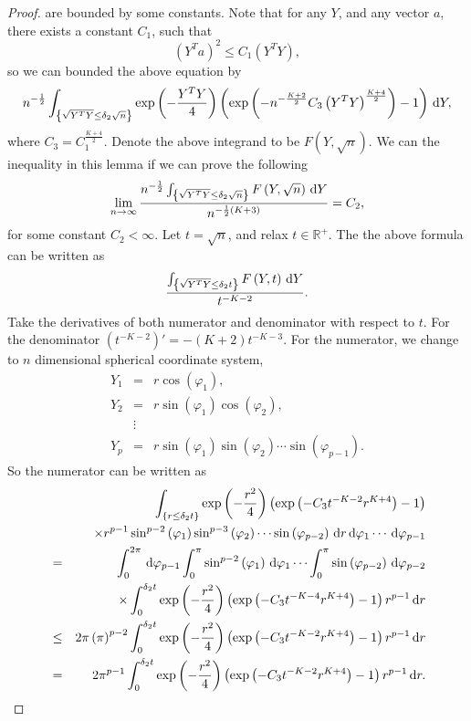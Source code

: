 \begin{proof}
are bounded by some constants. Note that for any $Y$, and any vector
$a$, there exists a constant $C_{1}$, such that 
\begin{equation}
\left(Y^{T}a\right)^{2}\le C_{1}\left(Y^{T}Y\right),\label{eq:average-inequality}
\end{equation}
so we can bounded the above equation by 
\[
n^{-\frac{1}{2}}\int_{\left\{ \sqrt{Y^{T}Y}\le\delta_{2}\sqrt{n}\right\} }\exp\left(-\frac{Y^{T}Y}{4}\right)\left(\exp\left(-n^{-\frac{K+2}{2}}C_{3}\left(Y^{T}Y\right)^{\frac{K+4}{2}}\right)-1\right)\,\mathrm{d} Y,
\]
where $C_{3}=C_{1}^{\frac{K+4}{2}}$. Denote the above integrand to
be $F\left(Y,\sqrt{n}\right)$. We can the inequality in this lemma
if we can prove the following 
\begin{equation}
\lim_{n\rightarrow\infty}\frac{n^{-\frac{1}{2}}\int_{\left\{ \sqrt{Y^{T}Y}\le\delta_{2}\sqrt{n}\right\} }F\left(Y,\sqrt{n}\right)\,\mathrm{d} Y}{n^{-\frac{1}{2}\left(K+3\right)}}=C_{2},\label{eq:lim-rhs-vs-lfs-inequality}
\end{equation}
for some constant $C_{2}<\infty$. Let $t=\sqrt{n}$, and relax $t\in\mathbb{R}^{+}$.
The the above formula can be written as 
\[
\frac{\int_{\left\{ \sqrt{Y^{T}Y}\le\delta_{2}t\right\} }F\left(Y,t\right)\,\mathrm{d} Y}{t^{-K-2}}.
\]
Take the derivatives of both numerator and denominator with respect
to $t$. For the denominator $\left(t^{-K-2}\right)'=-\left(K+2\right)t^{-K-3}.$
For the numerator, we change to $n$ dimensional spherical coordinate
system, 
\begin{eqnarray*}
Y_{1} & = & r\cos\left(\varphi_{1}\right),\\
Y_{2} & = & r\sin\left(\varphi_{1}\right)\cos\left(\varphi_{2}\right),\\
 & \vdots\\
Y_{p} & = & r\sin\left(\varphi_{1}\right)\sin\left(\varphi_{2}\right)\cdots\sin\left(\varphi_{p-1}\right).
\end{eqnarray*}
So the numerator can be written as 
\begin{eqnarray*}
 &  & \int_{\left\{ r\le\delta_{2}t\right\} }\exp\left(-\frac{r^{2}}{4}\right)\left(\exp\left(-C_{3}t^{-K-2}r^{K+4}\right)-1\right)\\
 &  & \times r^{p-1}\sin^{p-2}\left(\varphi_{1}\right)\sin^{p-3}\left(\varphi_{2}\right)\cdots\sin\left(\varphi_{p-2}\right)\,\mathrm{d} r\,\mathrm{d}\varphi_{1}\cdots\,\mathrm{d}\varphi_{p-1}\\
 & = & \int_{0}^{2\pi}\,\mathrm{d}\varphi_{p-1}\int_{0}^{\pi}\sin^{p-2}\left(\varphi_{1}\right)\,\mathrm{d}\varphi_{1}\cdots\int_{0}^{\pi}\sin\left(\varphi_{p-2}\right)\,\mathrm{d}\varphi_{p-2}\\
 &  & \times\int_{0}^{\delta_{2}t}\exp\left(-\frac{r^{2}}{4}\right)\left(\exp\left(-C_{3}t^{-K-4}r^{K+4}\right)-1\right)r^{p-1}\,\mathrm{d} r\\
 & \le & 2\pi\left(\pi\right)^{p-2}\int_{0}^{\delta_{2}t}\exp\left(-\frac{r^{2}}{4}\right)\left(\exp\left(-C_{3}t^{-K-2}r^{K+4}\right)-1\right)r^{p-1}\,\mathrm{d} r\\
 & = & 2\pi^{p-1}\int_{0}^{\delta_{2}t}\exp\left(-\frac{r^{2}}{4}\right)\left(\exp\left(-C_{3}t^{-K-2}r^{K+4}\right)-1\right)r^{p-1}\,\mathrm{d} r.
\end{eqnarray*}
 

\end{proof}

